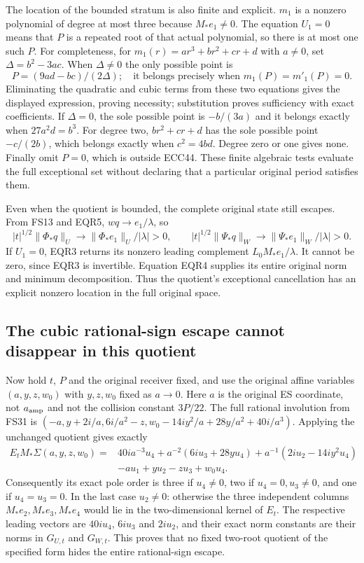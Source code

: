 \documentclass[11pt]{article}
\begin{document}
The location of the bounded stratum is also finite and explicit.
$m_1$ is a nonzero polynomial of degree at most three because
$M_*e_1\ne0$. The equation $U_1=0$ means that $P$ is a repeated
root of that actual polynomial, so there is at most one such $P$.
For completeness, for $m_1(r)=ar^3+br^2+cr+d$ with $a\ne0$,
set $\Delta=b^2-3ac$. When $\Delta\ne0$ the only possible point is
\[
 P=(9ad-bc)/(2\Delta);
 \quad\text{it belongs precisely when }m_1(P)=m'_1(P)=0.
 \tag{EQR11}
\]
Eliminating the quadratic and cubic terms from these two equations
gives the displayed expression, proving necessity; substitution proves
sufficiency with exact coefficients. If $\Delta=0$, the sole possible
point is $-b/(3a)$ and it belongs exactly when $27a^2d=b^3$.
For degree two, $br^2+cr+d$ has the sole possible point $-c/(2b)$,
which belongs exactly when $c^2=4bd$. Degree zero or one gives none.
Finally omit $P=0$, which is outside ECC44. These finite algebraic
tests evaluate the full exceptional set without declaring that a
particular original period satisfies them.

Even when the quotient is bounded, the complete original state still
escapes. From FS13 and EQR5, $wq\to e_1/\lambda$, so
\[
 |t|^{1/2}\|\Phi_*q\|_U
   \longrightarrow\|\Phi_*e_1\|_U/|\lambda|>0,
 \qquad
 |t|^{1/2}\|\Psi_*q\|_W
   \longrightarrow\|\Psi_*e_1\|_W/|\lambda|>0.
 \tag{EQR12}
\]
If $U_1=0$, EQR3 returns its nonzero leading complement
$L_0M_*e_1/\lambda$. It cannot be zero, since EQR3 is invertible.
Equation EQR4 supplies its entire original norm and minimum
decomposition. Thus the quotient's exceptional cancellation has an
explicit nonzero location in the full original space.

\subsection{The cubic rational-sign escape cannot disappear in this quotient}
Now hold $t$, $P$ and the original receiver fixed, and use the original
affine variables $(a,y,z,w_0)$ with $y,z,w_0$ fixed as $a\to0$.
Here $a$ is the original ES coordinate, not $a_{\rm amp}$ and not
the collision constant $3P/22$. The full rational involution from
FS31 is
$(-a,y+2i/a,6i/a^2-z,w_0-14iy^2/a+28y/a^2+40i/a^3)$.
Applying the unchanged quotient gives exactly
\[
 \begin{aligned}
 E_tM_*\Sigma(a,y,z,w_0)
 ={}&40i a^{-3}u_4
 +a^{-2}(6iu_3+28y u_4)
 +a^{-1}(2iu_2-14iy^2u_4)\\
 &-a u_1+y u_2-z u_3+w_0u_4.
 \end{aligned}\tag{EQR13}
\]
Consequently its exact pole order is three if $u_4\ne0$, two if
$u_4=0,u_3\ne0$, and one if $u_4=u_3=0$.
In the last case $u_2\ne0$: otherwise the three independent columns
$M_*e_2,M_*e_3,M_*e_4$ would lie in the two-dimensional kernel of
$E_t$. The respective leading vectors are $40iu_4$, $6iu_3$ and
$2iu_2$, and their exact norm constants are their norms in
$G_{U,t}$ and $G_{W,t}$. This proves that no fixed two-root quotient
of the specified form hides the entire rational-sign escape.
\end{document}
